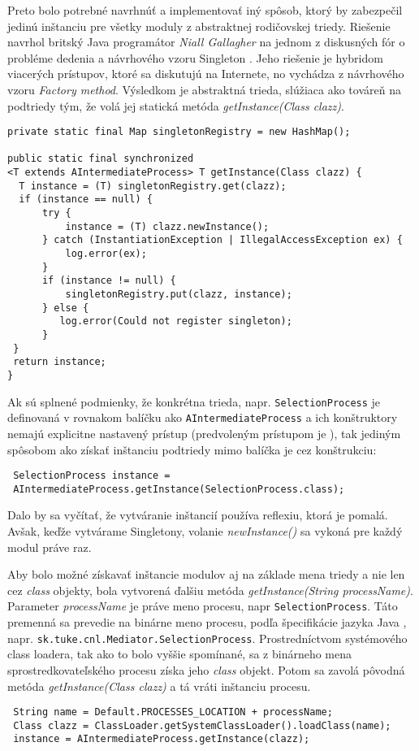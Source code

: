 Preto bolo potrebné navrhnúť a implementovať iný spôsob, ktorý by zabezpečil jedinú inštanciu pre všetky 
moduly z abstraktnej rodičovskej triedy. Riešenie navrhol britský Java programátor \emph{Niall Gallagher}
na jednom z diskusných fór o probléme dedenia a návrhového vzoru Singleton \citep{gallagher}.
Jeho riešenie je hybridom viacerých prístupov, ktoré sa diskutujú na Internete, no vychádza z 
návrhového vzoru \emph{Factory method}. Výsledkom je abstraktná trieda, slúžiaca ako továreň na 
podtriedy tým, že volá jej statická metóda \emph{getInstance(Class clazz)}. 
\begin{verbatim}
private static final Map singletonRegistry = new HashMap();

public static final synchronized 
<T extends AIntermediateProcess> T getInstance(Class clazz) {
  T instance = (T) singletonRegistry.get(clazz);
  if (instance == null) {
      try {
          instance = (T) clazz.newInstance();
      } catch (InstantiationException | IllegalAccessException ex) {
          log.error(ex);
      }
      if (instance != null) {
          singletonRegistry.put(clazz, instance);
      } else {
         log.error(Could not register singleton);
      }
 }
 return instance;
}
\end{verbatim}
Ak sú splnené podmienky, že konkrétna trieda, napr. \verb|SelectionProcess| je definovaná v rovnakom 
balíčku ako \verb|AIntermediateProcess| a ich konštruktory nemajú explicitne nastavený prístup 
(predvoleným prístupom je ), tak 
jediným spôsobom ako získať inštanciu podtriedy mimo balíčka je cez konštrukciu:
\begin{verbatim}
 SelectionProcess instance = 
 AIntermediateProcess.getInstance(SelectionProcess.class);
\end{verbatim}
Dalo by sa vyčítať, že vytváranie inštancií používa reflexiu, ktorá je pomalá. Avšak, keďže vytvárame 
Singletony, volanie \emph{newInstance()} sa vykoná pre každý modul práve raz.

Aby bolo možné získavať inštancie modulov aj na základe mena triedy a nie len cez \emph{class} objekty, bola 
vytvorená ďalšiu metóda \emph{getInstance(String processName)}. Parameter \emph{processName} je práve meno 
procesu, napr \verb|SelectionProcess|. Táto premenná sa prevedie na binárne meno procesu, 
podľa špecifikácie jazyka Java \citep{java_spec},
napr. \verb|sk.tuke.cnl.Mediator.SelectionProcess|.
Prostredníctvom systémového class loadera, tak ako to bolo vyššie spomínané, sa z binárneho mena 
sprostredkovateľského procesu získa jeho \emph{class} objekt. Potom sa zavolá pôvodná metóda 
\emph{getInstance(Class clazz)} a tá vráti inštanciu procesu.
\begin{verbatim}
 String name = Default.PROCESSES_LOCATION + processName;
 Class clazz = ClassLoader.getSystemClassLoader().loadClass(name);
 instance = AIntermediateProcess.getInstance(clazz);
\end{verbatim}



